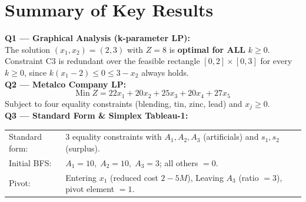\documentclass[12pt]{article}
\begin{document}
\newpage

\section{Summary of Key Results}

\begin{formulabox}
\textbf{Q1 --- Graphical Analysis (k-parameter LP):}\\[4pt]
The solution $(x_1, x_2) = (2, 3)$ with $Z = 8$ is \textbf{optimal for ALL} $k \geq 0$.\\
Constraint C3 is redundant over the feasible rectangle $[0,2]\times[0,3]$ for every $k \geq 0$,
since $k(x_1 - 2) \leq 0 \leq 3 - x_2$ always holds.\\[10pt]
%
\textbf{Q2 --- Metalco Company LP:}\\[4pt]
\[
  \text{Min}\; Z = 22x_1 + 20x_2 + 25x_3 + 20x_4 + 27x_5
\]
Subject to four equality constraints (blending, tin, zinc, lead) and $x_j \geq 0$.\\[10pt]
%
\textbf{Q3 --- Standard Form \& Simplex Tableau-1:}\\[4pt]
\begin{tabular}{lp{10cm}}
Standard form: & 3 equality constraints with $A_1, A_2, A_3$ (artificials) and $s_1, s_2$ (surplus). \\[4pt]
Initial BFS: & $A_1 = 10,\; A_2 = 10,\; A_3 = 3$; all others $= 0$. \\[4pt]
Pivot: & Entering $x_1$ (reduced cost $2-5M$), Leaving $A_3$ (ratio $= 3$), pivot element $= 1$.
\end{tabular}
\end{formulabox}
\end{document}
